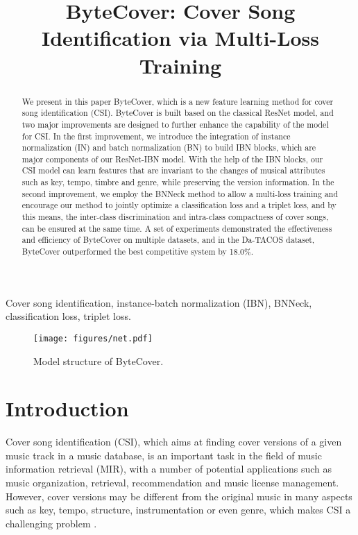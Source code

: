 \documentclass{article}
\title{ByteCover: Cover Song Identification via Multi-Loss Training}
\begin{document}
\maketitle
\begin{abstract}
We present in this paper ByteCover, which is a new feature learning method for cover song identification (CSI). ByteCover is built based on the classical ResNet model, and two major improvements are designed to further enhance the capability of the model for CSI. In the first improvement, we introduce the integration of instance normalization (IN) and batch normalization (BN) to build IBN blocks, which are major components of our ResNet-IBN model. With the help of the IBN blocks, our CSI model can learn features that are invariant to the changes of musical attributes such as key, tempo, timbre and genre, while preserving the version information. In the second improvement, we employ the BNNeck method to allow a multi-loss training and encourage our method to jointly optimize a classification loss and a triplet loss, and by this means, the inter-class discrimination and intra-class compactness of cover songs, can be ensured at the same time. A set of experiments demonstrated the effectiveness and efficiency of ByteCover on multiple datasets, and in the  Da-TACOS dataset, ByteCover outperformed the best competitive system by 18.0\%.
\end{abstract}
\begin{keywords}
Cover song identification, instance-batch normalization (IBN), BNNeck, classification loss, triplet loss.
\end{keywords}

\begin{figure*}
	\centering
	\texttt{[image: figures/net.pdf]}
\caption{Model structure of ByteCover.}
\label{fig:net}
\end{figure*}
\section{Introduction}
\label{sec:intro}
Cover song identification (CSI), which aims at finding cover versions of a given music track in a music database, is an important task in the field of music information retrieval (MIR), with a number of potential applications such as music organization, retrieval, recommendation and music license management. However, cover versions may be different from the original music in many aspects such as key, tempo, structure, instrumentation or even genre, which makes CSI a challenging problem \cite{serra2010audio}.
\end{document}
